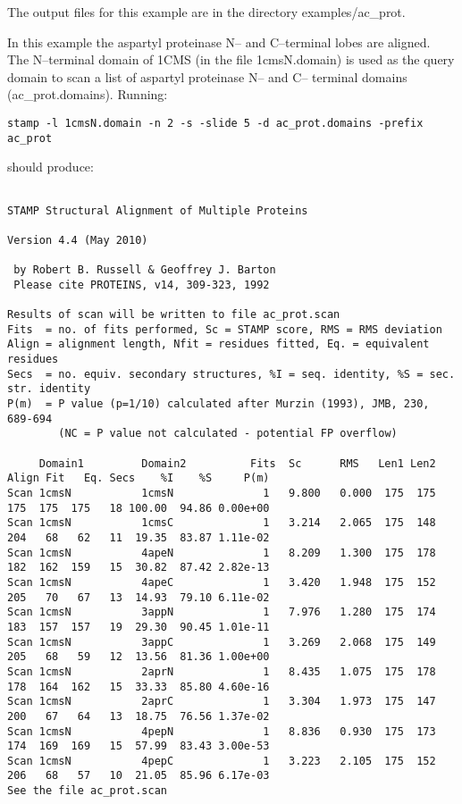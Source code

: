 The output files for this example are in the directory examples/ac\_prot.

In this example the aspartyl proteinase N--
and C--terminal lobes are aligned.
\\
The N--terminal domain of 1CMS (in the file 1cmsN.domain) is used as the query domain
to scan a list of aspartyl proteinase N-- and C-- terminal domains (ac\_prot.domains). Running:

\begin{scriptsize}\begin{verbatim}
stamp -l 1cmsN.domain -n 2 -s -slide 5 -d ac_prot.domains -prefix ac_prot
\end{verbatim} \end{scriptsize}

should produce:

\begin{scriptsize}\begin{verbatim}

STAMP Structural Alignment of Multiple Proteins

Version 4.4 (May 2010)

 by Robert B. Russell & Geoffrey J. Barton 
 Please cite PROTEINS, v14, 309-323, 1992

Results of scan will be written to file ac_prot.scan
Fits  = no. of fits performed, Sc = STAMP score, RMS = RMS deviation
Align = alignment length, Nfit = residues fitted, Eq. = equivalent residues
Secs  = no. equiv. secondary structures, %I = seq. identity, %S = sec. str. identity
P(m)  = P value (p=1/10) calculated after Murzin (1993), JMB, 230, 689-694
        (NC = P value not calculated - potential FP overflow)

     Domain1         Domain2          Fits  Sc      RMS   Len1 Len2 Align Fit   Eq. Secs    %I    %S     P(m)
Scan 1cmsN           1cmsN              1   9.800   0.000  175  175  175  175  175   18 100.00  94.86 0.00e+00
Scan 1cmsN           1cmsC              1   3.214   2.065  175  148  204   68   62   11  19.35  83.87 1.11e-02
Scan 1cmsN           4apeN              1   8.209   1.300  175  178  182  162  159   15  30.82  87.42 2.82e-13
Scan 1cmsN           4apeC              1   3.420   1.948  175  152  205   70   67   13  14.93  79.10 6.11e-02
Scan 1cmsN           3appN              1   7.976   1.280  175  174  183  157  157   19  29.30  90.45 1.01e-11
Scan 1cmsN           3appC              1   3.269   2.068  175  149  205   68   59   12  13.56  81.36 1.00e+00
Scan 1cmsN           2aprN              1   8.435   1.075  175  178  178  164  162   15  33.33  85.80 4.60e-16
Scan 1cmsN           2aprC              1   3.304   1.973  175  147  200   67   64   13  18.75  76.56 1.37e-02
Scan 1cmsN           4pepN              1   8.836   0.930  175  173  174  169  169   15  57.99  83.43 3.00e-53
Scan 1cmsN           4pepC              1   3.223   2.105  175  152  206   68   57   10  21.05  85.96 6.17e-03
See the file ac_prot.scan

\end{verbatim} \end{scriptsize}

